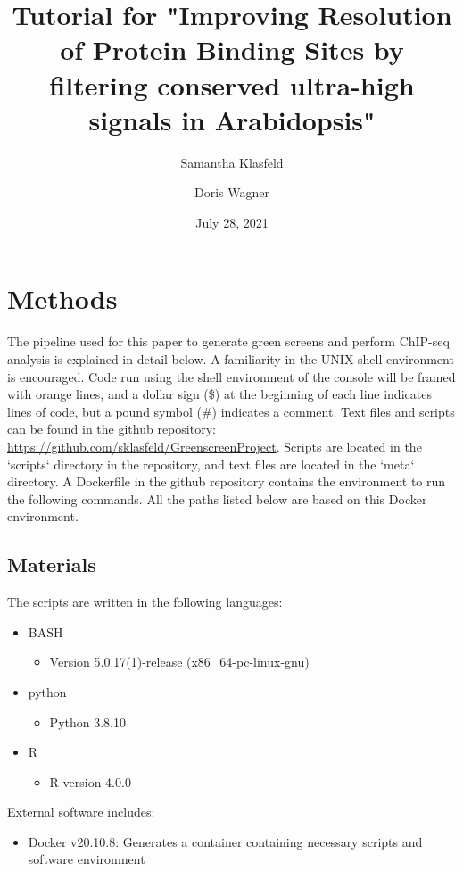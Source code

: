 \documentclass{article}
\title{Tutorial for "Improving Resolution of Protein Binding Sites by filtering conserved ultra-high signals in Arabidopsis"}
\author[1]{Samantha Klasfeld}
\author[1]{Doris Wagner}
\affil[1]{Department of Biology, University of Pennsylvania}
\date{July 28, 2021}
\begin{document}
\begin{sloppypar}
\maketitle

\tableofcontents
\newpage

\section{Methods}
The pipeline used for this paper to generate green screens and perform ChIP-seq analysis is explained in detail below. A familiarity in the UNIX shell environment is encouraged.  Code run using the shell environment of the console will be framed with orange lines,  and a dollar sign (\$) at the beginning of each line indicates lines of code, but a pound symbol (\#) indicates a comment. Text files and scripts can be found in the github repository: \url{https://github.com/sklasfeld/GreenscreenProject}. Scripts are located in the `scripts` directory in the repository, and text files are located in the `meta` directory. A Dockerfile in the github repository contains the environment to run the following commands. All the paths listed below are based on this Docker environment.

\subsection{Materials}
The scripts are written in the following languages:
\begin{itemize}
    \item BASH
    \begin{itemize}
        \item Version 5.0.17(1)-release (x86\_64-pc-linux-gnu)
    \end{itemize}
    \item python
    \begin{itemize}
        \item Python 3.8.10
    \end{itemize}
    \item R
    \begin{itemize}
        \item R version 4.0.0
    \end{itemize}
\end{itemize}

External software includes:
\begin{itemize}
    \item Docker v20.10.8: Generates a container containing necessary scripts and software environment \cite{Docker}
\end{itemize}


\end{sloppypar}
\end{document}
